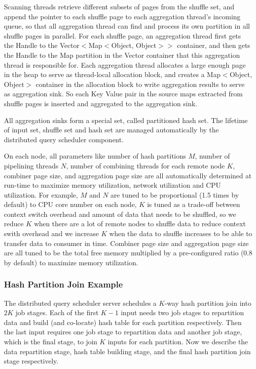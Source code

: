 Scanning threads retrieve different subsets of pages from the shuffle set, and append the pointer to each shuffle page to each aggregation thread's incoming queue, so that all aggregation thread can find and process its own partition in all shuffle pages in parallel. For each shuffle page, an aggregation thread first gets the Handle to the Vector$<$Map$<$Object, Object$>$$>$ container, and then gets the Handle to the Map partition in the Vector container that this aggregation thread is responsible for. Each aggregation thread allocates a large enough page in the heap to serve as thread-local allocation block, and creates a Map$<$Object, Object$>$ container in the allocation block to write aggregation results to serve as aggregation sink. So each Key Value pair in the source maps extracted from shuffle pages is inserted and aggregated to the aggregation sink. 

All aggregation sinks form a special set, called partitioned hash set. The lifetime of input set, shuffle set and hash set are managed automatically by the distributed query scheduler component.


\vspace{5pt}

On each node, all parameters like number of hash partitions $M$, number of pipelining threads $N$, number of combining threads for each remote node $K$, combiner page size, and aggregation page size are all automatically determined at run-time to maximize memory utilization, network utilization and CPU utilization. For example, $M$ and $N$ are tuned to be proportional (1.5 times by default) to CPU core number on each node, $K$ is tuned as a trade-off between context switch overhead and amount of data that needs to be shuffled, so we reduce $K$ when there are a lot of remote nodes to shuffle data to reduce context swith overhead and we increase $K$ when the data to shuffle increases to be able to transfer data to consumer in time. Combiner page size and aggregation page size are all tuned to be the total free memory multiplied by a pre-configured ratio (0.8 by default) to maximize memory utilization. 

\subsubsection{Hash Partition Join Example}

The distributed query scheduler server schedules a $K$-way hash partition join into $2K$ job stages. Each of the first $K-1$ input needs two job stages to repartition data and build (and co-locate) hash table for each partition respectively. Then the last input requires one job stage to repartition data and  another job stage, which is the final stage, to join $K$ inputs for each partition. Now we describe the data repartition stage, hash table building stage, and the final hash partition join stage respectively.

